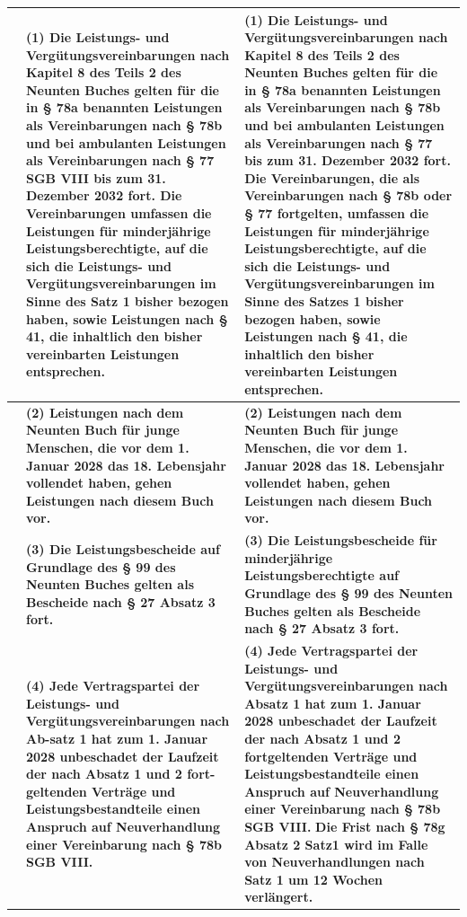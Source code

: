 \documentclass[10pt,a4paper,landscape]{article}
\begin{document}
\begin{longtable}{|L{8.6cm}|L{8.6cm}|L{8.6cm}|}
 & \textbf{(1) Die Leistungs- und Vergütungsvereinbarungen nach Kapitel 8 des Teils 2 des Neunten Buches gelten für die in \S{} 78a benannten Leistungen als Vereinbarungen nach \S{} 78b und bei ambulanten Leistungen als Vereinbarungen nach \S{} 77 SGB VIII bis zum 31. Dezember 2032 fort. Die Vereinbarungen umfassen die Leistungen für minderjährige Leistungsberechtigte, auf die sich die Leistungs- und Vergütungsvereinbarungen im Sinne des Satz 1 bisher bezogen haben, sowie Leistungen nach \S{} 41, die inhaltlich den bisher vereinbarten Leistungen entsprechen. } & \textbf{(1) Die Leistungs- und Vergütungsvereinbarungen nach Kapitel 8 des Teils 2 des Neunten Buches gelten für die in \S{} 78a benannten Leistungen als Vereinbarungen nach \S{} 78b und bei ambulanten Leistungen als Vereinbarungen nach \S{} 77 bis zum 31. Dezember 2032 fort. Die Vereinbarungen, die als Vereinbarungen nach \S{} 78b oder \S{} 77 fortgelten, umfassen die Leistungen für minderjährige Leistungsberechtigte, auf die sich die Leistungs- und Vergütungsvereinbarungen im Sinne des Satzes 1 bisher bezogen haben, sowie Leistungen nach \S{} 41, die inhaltlich den bisher vereinbarten Leistungen entsprechen. } \\
\hline
 & \textbf{(2) Leistungen nach dem Neunten Buch für junge Menschen, die vor dem 1. Januar 2028 das 18. Lebensjahr vollendet haben, gehen Leistungen nach diesem Buch vor. } & \textbf{(2) Leistungen nach dem Neunten Buch für junge Menschen, die vor dem 1. Januar 2028 das 18. Lebensjahr vollendet haben, gehen Leistungen nach diesem Buch vor. } \\
\hline
 & \textbf{(3) Die Leistungsbescheide auf Grundlage des \S{} 99 des Neunten Buches gelten als Bescheide nach \S{} 27 Absatz 3 fort. } & \textbf{(3) Die Leistungsbescheide für minderjährige Leistungsberechtigte auf Grundlage des \S{} 99 des Neunten Buches gelten als Bescheide nach \S{} 27 Absatz 3 fort. } \\
\hline
 & \textbf{(4) Jede Vertragspartei der Leistungs- und Vergütungsvereinbarungen nach Ab-satz 1 hat zum 1. Januar 2028 unbeschadet der Laufzeit der nach Absatz 1 und 2 fort-geltenden Verträge und Leistungsbestandteile einen Anspruch auf Neuverhandlung einer Vereinbarung nach \S{} 78b SGB VIII. } & \textbf{(4) Jede Vertragspartei der Leistungs- und Vergütungsvereinbarungen nach Absatz 1 hat zum 1. Januar 2028 unbeschadet der Laufzeit der nach Absatz 1 und 2 fortgeltenden Verträge und Leistungsbestandteile einen Anspruch auf Neuverhandlung einer Vereinbarung nach \S{} 78b SGB VIII.} \textbf{Die Frist nach \S{} 78g Absatz 2 Satz1 wird im Falle von Neuverhandlungen nach Satz 1 um 12 Wochen verlängert. } \\

\end{longtable}
\end{document}
